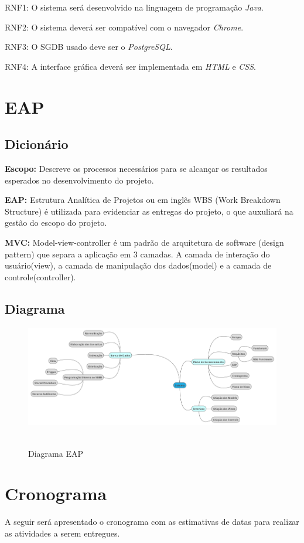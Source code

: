 \documentclass[
	12pt,				%
	oneside,			%
	a4paper,			%
	brazil				%
	]{abntex2}
\begin{document}
RNF1: O sistema será desenvolvido na linguagem de programação \textit{Java}.

RNF2: O sistema deverá ser compatível com o navegador \textit{Chrome}.

RNF3: O SGDB usado deve ser o 
\textit{PostgreSQL}.

RNF4: A interface gráfica deverá ser implementada em \textit{HTML} e \textit{CSS}.

\chapter{EAP}
\section{Dicionário}
\textbf{Escopo:} Descreve os processos necessários para se alcançar os resultados esperados no desenvolvimento do projeto.

\textbf{EAP:} Estrutura Analítica de Projetos ou em inglês WBS (Work Breakdown Structure) é utilizada para evidenciar as entregas do projeto, o que auxuliará na gestão do escopo do projeto. 

\textbf{MVC:} Model-view-controller é um padrão de arquitetura de software (design pattern) que separa a aplicação em 3 camadas. A camada de interação do usuário(view), a camada de manipulação dos dados(model) e a camada de controle(controller).

\section{Diagrama}
\begin{figure}[htb]
\includegraphics[width=1.05\textwidth]{diagrama.png}\
\caption{\label{fig: diagrama}Diagrama EAP}
\end{figure}

\chapter{Cronograma}
A seguir será apresentado o cronograma com as estimativas de datas para realizar as atividades a serem entregues.
\end{document}
